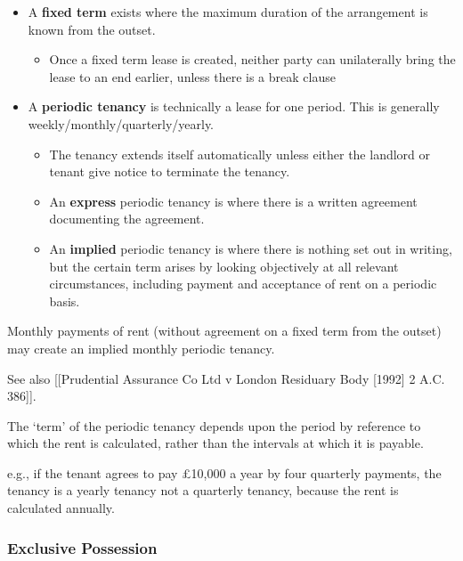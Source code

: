 \documentclass[
]{article}
\newenvironment{Shaded}{}{}
\newcommand{\NormalTok}[1]{#1}
\providecommand{\tightlist}{%
  \setlength{\itemsep}{0pt}\setlength{\parskip}{0pt}}
\begin{document}
\begin{itemize}
\tightlist
\item
  A \textbf{fixed term} exists where the maximum duration of the
  arrangement is known from the outset.

  \begin{itemize}
  \tightlist
  \item
    Once a fixed term lease is created, neither party can unilaterally
    bring the lease to an end earlier, unless there is a break clause
  \end{itemize}
\item
  A \textbf{periodic tenancy} is technically a lease for one period.
  This is generally weekly/monthly/quarterly/yearly.

  \begin{itemize}
  \tightlist
  \item
    The tenancy extends itself automatically unless either the landlord
    or tenant give notice to terminate the tenancy.
  \item
    An \textbf{express} periodic tenancy is where there is a written
    agreement documenting the agreement.
  \item
    An \textbf{implied} periodic tenancy is where there is nothing set
    out in writing, but the certain term arises by looking objectively
    at all relevant circumstances, including payment and acceptance of
    rent on a periodic basis.
  \end{itemize}
\end{itemize}

\begin{Shaded}
\begin{Highlighting}[]
\NormalTok{Monthly payments of rent (without agreement on a fixed term from the outset) may create an implied monthly periodic tenancy.}
\end{Highlighting}
\end{Shaded}

See also {[}{[}Prudential Assurance Co Ltd v London Residuary Body
{[}1992{]} 2 A.C. 386{]}{]}.

The `term' of the periodic tenancy depends upon the period by reference
to which the rent is calculated, rather than the intervals at which it
is payable.

e.g., if the tenant agrees to pay £10,000 a year by four quarterly
payments, the tenancy is a yearly tenancy not a quarterly tenancy,
because the rent is calculated annually.

\hypertarget{exclusive-possession}{%
\subsubsection{Exclusive Possession}\label{exclusive-possession}}
\end{document}
